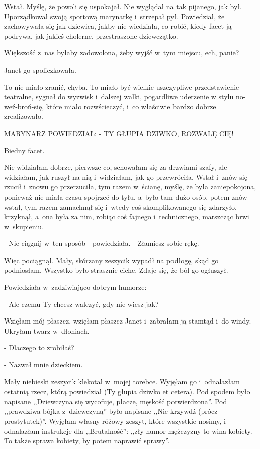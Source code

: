 \documentclass[oneside,polish,12pt,sfheadings]{mwbk}
\begin{document}
Wstał. Myślę, że powoli się uspokajał. Nie wyglądał na tak pijanego,
jak był. Uporządkował swoją sportową marynarkę i~strzepał pył. Powiedział,
że zachowywała się jak dziewica, jakby nie wiedziała, co robić, kiedy
facet ją podrywa, jak jakieś cholerne, przestraszone dziewczątko.

Większość z~nas byłaby zadowolona, żeby wyjść w~tym miejscu, ech,
panie?

Janet go spoliczkowała.

To nie miało zranić, chyba. To miało być wielkie uszczypliwe przedstawienie
teatralne, sygnał do wyzwisk i~dalszej walki, pogardliwe uderzenie
w stylu no-weź-broń-się, które miało rozwścieczyć, i~co właściwie
bardzo dobrze zrealizowało.

MARYNARZ POWIEDZIAŁ: - TY GŁUPIA DZIWKO, ROZWALĘ CIĘ!

Biedny facet.

Nie widziałam dobrze, pierwsze co, schowałam się za drzwiami szafy,
ale widziałam, jak ruszył na nią i~widziałam, jak go przewróciła.
Wstał i~znów się rzucił i~znowu go przerzuciła, tym razem w~ścianę,
myślę, że była zaniepokojona, ponieważ nie miała czasu spojrzeć do
tyłu, a~było tam dużo osób, potem znów wstał, tym razem zamachnął
się i~wtedy coś skomplikowanego się zdarzyło, krzyknął, a~ona była
za nim, robiąc coś fajnego i~technicznego, marszcząc brwi w~skupieniu.

- Nie ciągnij w~ten sposób - powiedziała. - Złamiesz sobie rękę.

Więc pociągnął. Mały, skórzany zeszycik wypadł na podłogę, skąd go
podniosłam. Wszystko było strasznie ciche. Zdaje się, że ból go ogłuszył.

Powiedziała w~zadziwiająco dobrym humorze: 

- Ale czemu Ty chcesz walczyć,
gdy nie wiesz jak?

Wzięłam mój płaszcz, wzięłam płaszcz Janet i~zabrałam ją stamtąd i~do windy. Ukryłam twarz w~dłoniach.

- Dlaczego to zrobiłaś?

- Nazwał mnie dzieckiem.

Mały niebieski zeszycik klekotał w~mojej torebce. Wyjęłam go i~odnalazłam
ostatnią rzecz, którą powiedział (Ty głupia dziwko et cetera). Pod
spodem było napisane ,,Dziewczyna się wycofuje, płacze, męskość potwierdzona''.
Pod ,,prawdziwa bójka z~dziewczyną'' było napisane ,,Nie krzywdź (prócz
prostytutek)''. Wyjęłam własny różowy zeszyt, które wszystkie nosimy,
i odnalazłam instrukcje dla ,,Brutalność'': ,,zły humor mężczyzny to
wina kobiety. To także sprawa kobiety, by potem naprawić sprawy''.
\end{document}
